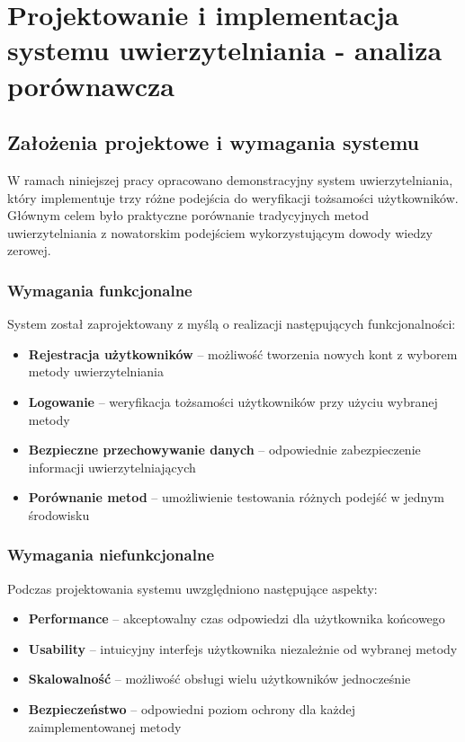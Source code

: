 \documentclass{article}
\begin{document}
\newpage
\section{Projektowanie i implementacja systemu uwierzytelniania - analiza porównawcza}

\subsection{Założenia projektowe i wymagania systemu}

W ramach niniejszej pracy opracowano demonstracyjny system uwierzytelniania, który implementuje trzy różne podejścia do weryfikacji tożsamości użytkowników. Głównym celem było praktyczne porównanie tradycyjnych metod uwierzytelniania z nowatorskim podejściem wykorzystującym dowody wiedzy zerowej.

\subsubsection{Wymagania funkcjonalne}
System został zaprojektowany z myślą o realizacji następujących funkcjonalności:
\begin{itemize}
    \item \textbf{Rejestracja użytkowników} – możliwość tworzenia nowych kont z wyborem metody uwierzytelniania
    \item \textbf{Logowanie} – weryfikacja tożsamości użytkowników przy użyciu wybranej metody
    \item \textbf{Bezpieczne przechowywanie danych} – odpowiednie zabezpieczenie informacji uwierzytelniających
    \item \textbf{Porównanie metod} – umożliwienie testowania różnych podejść w jednym środowisku
\end{itemize}

\subsubsection{Wymagania niefunkcjonalne}
Podczas projektowania systemu uwzględniono następujące aspekty:
\begin{itemize}
    \item \textbf{Performance} – akceptowalny czas odpowiedzi dla użytkownika końcowego
    \item \textbf{Usability} – intuicyjny interfejs użytkownika niezależnie od wybranej metody
    \item \textbf{Skalowalność} – możliwość obsługi wielu użytkowników jednocześnie
    \item \textbf{Bezpieczeństwo} – odpowiedni poziom ochrony dla każdej zaimplementowanej metody
\end{itemize}
\end{document}
